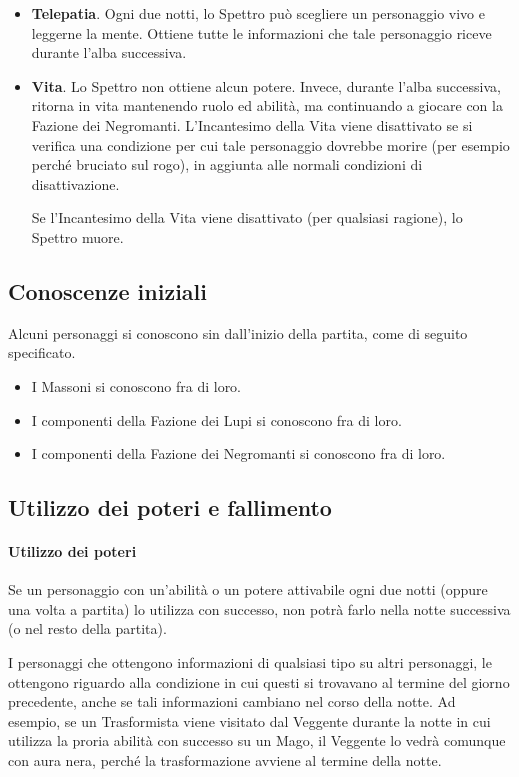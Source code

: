 \documentclass[a4paper,10pt]{article}
\begin{document}
\begin{itemize}
	\item {\bf Telepatia}. Ogni due notti, lo Spettro può scegliere un personaggio vivo e leggerne la mente. Ottiene tutte le informazioni che tale personaggio riceve durante l'alba successiva.
	
	\item {\bf Vita}. Lo Spettro non ottiene alcun potere. Invece, durante l'alba successiva, ritorna in vita mantenendo ruolo ed abilità, ma continuando a giocare con la Fazione dei Negromanti. L'Incantesimo della Vita viene disattivato se si verifica una condizione per cui tale personaggio dovrebbe morire (per esempio perché bruciato sul rogo), in aggiunta alle normali condizioni di disattivazione.
	
	Se l'Incantesimo della Vita viene disattivato (per qualsiasi ragione), lo Spettro muore.
 
\end{itemize}

\subsection{Conoscenze iniziali}

Alcuni personaggi si conoscono sin dall'inizio della partita, come di seguito specificato.

\begin{itemize}
	\item I Massoni si conoscono fra di loro.
	\item I componenti della Fazione dei Lupi si conoscono fra di loro.
	\item I componenti della Fazione dei Negromanti si conoscono fra di loro.
\end{itemize}

\subsection{Utilizzo dei poteri e fallimento}
\label{fallimento}

\paragraph{Utilizzo dei poteri} 

Se un personaggio con un'abilità o un potere attivabile ogni due notti (oppure una volta a partita) lo utilizza con successo, non potrà farlo nella notte successiva (o nel resto della partita).

I personaggi che ottengono informazioni di qualsiasi tipo su altri personaggi, le ottengono riguardo alla condizione in cui questi si trovavano al termine del giorno precedente, anche se tali informazioni cambiano nel corso della notte.
Ad esempio, se un Trasformista viene visitato dal Veggente durante la notte in cui utilizza la proria abilità con successo su un Mago, il Veggente lo vedrà comunque con aura nera, perché la trasformazione avviene al termine della notte.
\end{document}
